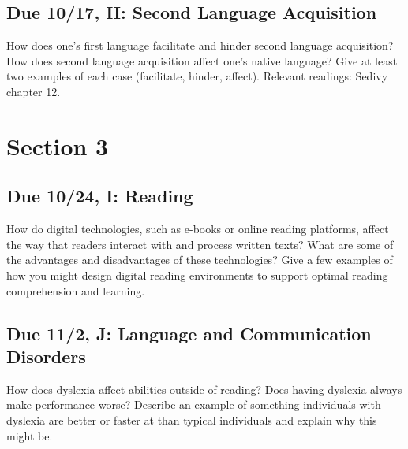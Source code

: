 \documentclass[
  letterpaper,
  DIV=11,
  numbers=noendperiod]{scrreprt}
\begin{document}
\hypertarget{due-1017-h-second-language-acquisition}{%
\subsection*{Due 10/17, H: Second Language
Acquisition}\label{due-1017-h-second-language-acquisition}}

How does one's first language facilitate and hinder second language
acquisition? How does second language acquisition affect one's native
language? Give at least two examples of each case (facilitate, hinder,
affect). Relevant readings: Sedivy chapter 12.

\hypertarget{section-3}{%
\section*{\texorpdfstring{{Section 3}}{Section 3}}\label{section-3}}


\hypertarget{due-1024-i-reading}{%
\subsection*{Due 10/24, I: Reading}\label{due-1024-i-reading}}

How do digital technologies, such as e-books or online reading
platforms, affect the way that readers interact with and process written
texts? What are some of the advantages and disadvantages of these
technologies? Give a few examples of how you might design digital
reading environments to support optimal reading comprehension and
learning.

\hypertarget{due-112-j-language-and-communication-disorders}{%
\subsection*{Due 11/2, J: Language and Communication
Disorders}\label{due-112-j-language-and-communication-disorders}}

How does dyslexia affect abilities outside of reading? Does having
dyslexia always make performance worse? Describe an example of something
individuals with dyslexia are better or faster at than typical
individuals and explain why this might be.
\end{document}
